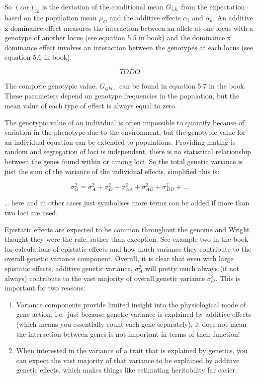 \documentclass[
]{book}
\providecommand{\tightlist}{%
  \setlength{\itemsep}{0pt}\setlength{\parskip}{0pt}}
\begin{document}
So \(\left(\alpha\alpha\right)_{ik}\) is the deviation of the conditional mean \(G_{i.k.}\) from the expectation based on the population mean \(\mu_{G}\) and the additive effects \(\alpha_{i}\) and \(\alpha_{k}\). An additive x dominance effect measures the interaction between an allele at one locus with a genotype of another locus (see equation 5.5 in book) and the dominance x dominance effect involves an interaction between the genotypes at each locus (see equation 5.6 in book).

\begin{equation}
  TO DO
  \label{eq:complete-genotypic-value}
\end{equation}

The complete genotypic value, \(G_{ijkl...}\) can be found in equation 5.7 in the book. These parameters depend on genotype frequencies in the population, but the mean value of each type of effect is always equal to zero.

The genotypic value of an individual is often impossible to quantify because of variation in the phenotype due to the environment, but the genotypic value for an individual equation can be extended to populations. Providing mating is random and segregation of loci is independent, there is no statistical relationship between the genes found within or among loci. So the total genetic variance is just the sum of the variance of the individual effects, simplified this is:

\begin{equation}
  \sigma^{2}_{G} = \sigma^{2}_{A} + \sigma^{2}_{D} + \sigma^{2}_{AA} + \sigma^{2}_{AD} + \sigma^{2}_{DD} + ...
  \label{eq:multilocus-genetic-variance}
\end{equation}

\ldots{} here and in other cases just symbolises more terms can be added if more than two loci are used.

Epistatic effects are expected to be common throughout the genome and Wright thought they were the rule, rather than exception. See example two in the book for calculations of epistatic effects and how much variance they contribute to the overall genetic variance component. Overall, it is clear that even with large epistatic effects, additive genetic variance, \(\sigma^{2}_{A}\) will pretty much always (if not always) contribute to the vast majority of overall genetic variance \(\sigma^{2}_{G}\). This is important for two reasons:

\begin{enumerate}
\def\labelenumi{\arabic{enumi}.}
\tightlist
\item
  Variance components provide limited insight into the physiological mode of gene action, i.e.~just because genetic variance is explained by additive effects (which means you essentially count each gene separately), it does not mean the interaction between genes is not important in terms of their function!
\item
  When interested in the variance of a trait that is explained by genetics, you can expect the vast majority of that variance to be explained by additive genetic effects, which makes things like estimating heritability far easier.
\end{enumerate}
\end{document}
